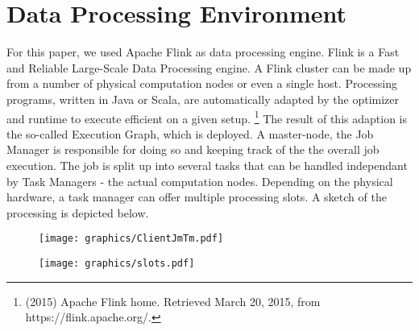 \section{Data Processing Environment}
For this paper, we used Apache Flink as data processing engine. Flink is a Fast and Reliable
Large-Scale Data Processing engine. A Flink cluster can be made up from a number of physical
computation nodes or even a single host. Processing programs, written in Java or Scala, are
automatically adapted by the optimizer and runtime to execute efficient on a given setup.
\footnote{(2015) Apache Flink home. Retrieved March 20, 2015, from https://flink.apache.org/.}
The result of this adaption is the so-called Execution Graph, which is deployed. A master-node, the
Job Manager is responsible for doing so and keeping track of the the overall job execution. The job
is split up into several tasks that can be handled independant by Task Managers - the actual
computation nodes.  Depending on the physical hardware, a task manager can offer multiple processing
slots. A sketch of the processing is depicted below.

\begin{figure}
    \centering
    \begin{minipage}{0.5\textwidth}
        \centering
        \texttt{[image: graphics/ClientJmTm.pdf]}
        \label{fig:job_execution}
    \end{minipage}%
    \begin{minipage}{0.5\textwidth}
        \centering
        \texttt{[image: graphics/slots.pdf]}
        \label{fig:embedding}
    \end{minipage}
\end{figure}



